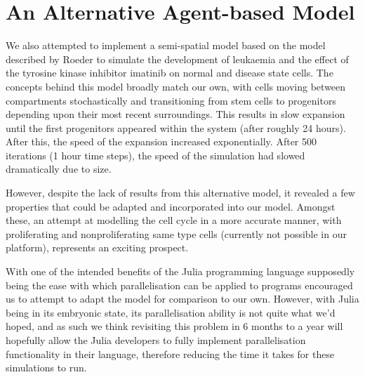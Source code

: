 \documentclass[12pt]{article}
\begin{document}
\section{An Alternative Agent-based Model}
We also attempted to implement a semi-spatial model based on the model 
described by Roeder to simulate the development of leukaemia and the 
effect of the tyrosine kinase inhibitor imatinib on normal and disease 
state cells. The concepts behind this model broadly match our own, with 
cells moving between compartments stochastically and transitioning from 
stem cells to progenitors depending upon their most recent surroundings. 
This results in slow expansion until the first progenitors appeared 
within the system (after roughly 24 hours). After this, the speed of the 
expansion increased exponentially. After 500 iterations (1 hour time 
steps), the speed of the simulation had slowed dramatically due to size.

However, despite the lack of results from this alternative model, it 
revealed a few properties that could be adapted and incorporated into 
our model. Amongst these, an attempt at modelling the cell cycle in a 
more accurate manner, with proliferating and nonproliferating same type 
cells (currently not possible in our platform), represents an exciting 
prospect.

With one of the intended benefits of the Julia programming language 
supposedly being the ease with which parallelisation can be applied to 
programs encouraged us to attempt to adapt the model for comparison to 
our own. However, with Julia being in its embryonic state, its 
parallelisation ability is not quite what we'd hoped, and as such we 
think revisiting this problem in 6 months to a year will hopefully allow 
the Julia developers to fully implement parallelisation functionality in 
their language, therefore reducing the time it takes for these 
simulations to run.

\newpage
\end{document}
